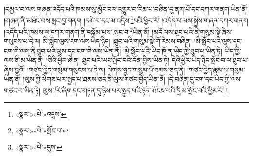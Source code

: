 །དམྱལ་བ་ལས་གཞན་འདོད་པའི་ཁམས་སུ་མྱོང་བར་འགྱུར་བ་རིམ་པ་བཞིན་དུ་ནག་པོ་དང་དཀར་གནག་ཡིན་ནོ། །གཞན་ནི་མཐོང་བས་སྤང་བྱ་གནག །དགེ་བ་དང་མ་འདྲེས་\footnote{«སྣར་»«པེ་»འདྲས་}པའི་ཕྱིར་རོ། །འདོད་པ་ལས་སྐྱེས་གཞན་དཀར་གནག །འདོད་པའི་ཁམས་ལ་དཀར་གནག་ནི་བསྒོམ་པས་:སྤང་བ་\footnote{«སྣར་»«པེ་»སྤོང་བ་}ཡིན་ནོ། །མདོ་ལས་ཐུབ་པའི་ནི་གསུམ་སྟེ་ཞེས་གསུངས་པ་དེ་ལ། མི་སློབ་ལུས་ངག་ལས་ཡིད་ཉིད། །ཐུབ་པའི་གསུམ་སྟེ་གོ་རིམས་བཞིན། །མི་སློབ་པའི་ལུས་དང་ངག་གི་ལས་ནི་ཐུབ་པའི་ལུས་དང་ངག་གི་ལས་ཡིན་ནོ། །མི་སློབ་པའི་ཡིད་ཁོ་ན་ཡིད་ཀྱི་ཐུབ་པ་ཡིན་ཏེ། ཡིད་ཀྱི་ལས་ནི་མ་ཡིན་ནོ། །ཅིའི་ཕྱིར་ཞེ་ན། ཐུབ་པའི་ཡང་སྤོང་བའི་དོན་གྱིས་ཡིན་ཏེ། དེའི་ཕྱིར་ཡིད་ཉིད་སྤོང་བ་ལ་ཐུབ་པ་ཞེས་བྱའོ། །གཙང་བྱེད་གསུམ་གསུངས་པ་དེ་ལ། ལེགས་སྤྱད་གསུམ་པོ་ཐམས་ཅད་ནི། །གཙང་བྱེད་རྣམ་པ་གསུམ་ཡིན་ནོ། །ལུས་ཀྱི་ལེགས་པར་སྤྱད་པ་ཐམས་ཅད་ནི་ལུས་གཙང་བྱེད་ཡིན་ནོ། །དེ་བཞིན་དུ་ངག་དང་ཡིད་ཀྱི་ལས་གཙང་བ་ཡིན་ཏེ། ལུས་\footnote{«སྣར་»«པེ་»དུས་}རེ་ཞིག་དང་གཏན་དུ་ཉེས་པར་སྤྱད་པའི་ཉོན་མོངས་པའི་དྲི་མ་སྤོང་བའི་ཕྱིར་རོ། །
